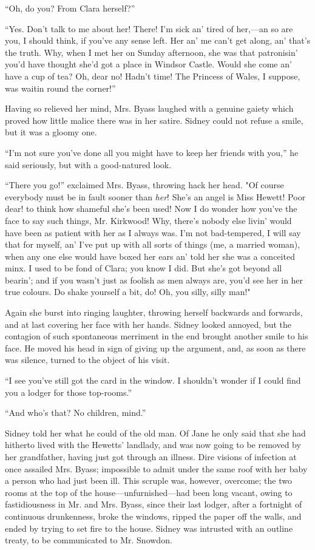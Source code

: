 ``Oh, do you? From Clara herself?''

``Yes. Don't talk to me about her! There! I'm sick an' tired of
her,---an so are you, I should think, if you've any sense left. Her an'
me can't get along, an' that's the truth. Why, when I met her on Sunday
afternoon, she was that patronisin' you'd have thought she'd got a place
in Windsor Castle. Would she come an' have a cup of tea? Oh, dear no!
Hadn't time! The Princess of Wales, I suppose, was waitin round the
corner!''

Having so relieved her mind, Mrs. Byass laughed with a genuine gaiety
which proved how little malice there was in her satire. Sidney could not
refuse a smile, but it was a gloomy one.

{\protect\hypertarget{158}{}{}}``I'm not sure you've done all you might
have to keep her friends with you,'' he said seriously, but with a
good-natured look.

``There you go!'' exclaimed Mrs. Byass, throwing hack her head. "Of
course everybody must be in fault sooner than \emph{her}! She's an angel
is Miss Hewett! Poor dear! to think how shameful she's been used! Now I
do wonder how you've the face to say such things, Mr. Kirkwood! Why,
there's nobody else livin' would have been as patient with her as I
always was. I'm not bad-tempered, I will say that for myself, an' I've
put up with all sorts of things (me, a married woman), when any one else
would have boxed her ears an' told her she was a conceited minx. I used
to be fond of Clara; you know I did. But she's got beyond all bearin';
and if you wasn't just as foolish as men always are, you'd see her in
her true colours. Do shake yourself a bit, do! Oh, you silly, silly
man!"

Again she burst into ringing laughter, throwing herself backwards and
forwards, and {\protect\hypertarget{159}{}{}}at last covering her face
with her hands. Sidney looked annoyed, but the contagion of such
spontaneous merriment in the end brought another smile to his face. He
moved his head in sign of giving up the argument, and, as soon as there
was silence, turned to the object of his visit.

``I see you've still got the card in the window. I shouldn't wonder if I
could find you a lodger for those top-rooms.''

``And who's that? No children, mind.''

Sidney told her what he could of the old man. Of Jane he only said that
she had hitherto lived with the Hewetts' landlady, and was now going to
be removed by her grandfather, having just got through an illness. Dire
visions of infection at once assailed Mrs. Byass; impossible to admit
under the same roof with her baby a person who had just been ill. This
scruple was, however, overcome; the two rooms at the top of the
house---unfurnished---had been long vacant, owing to fastidiousness in
Mr. and Mrs. Byass, since their last lodger, after a fortnight of
{\protect\hypertarget{160}{}{}}continuous drunkenness, broke the
windows, ripped the paper off the walls, and ended by trying to set fire
to the house. Sidney was intrusted with an outline treaty, to be
communicated to Mr. Snowdon.

